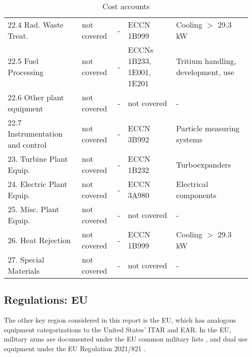 \begin{table}[h!]
{\begin{tabular}{p{4cm}p{3cm}p{3cm}p{3cm}p{3cm}}
        22.4 Rad. Waste Treat. & not covered & - & ECCN 1B999 & Cooling $>$ 29.3 kW \\
        22.5 Fuel Processing & not covered & - & ECCNs 1B233, 1E001, 1E201 & Tritium handling, development, use \\
        22.6 Other plant equipment & not covered & - & not covered & - \\
        22.7 Instrumentation and control & not covered & - & ECCN 3B992 & Particle measuring systems \\
        23. Turbine Plant Equip. & not covered & - & ECCN 1B232 & Turboexpanders \\
        24. Electric Plant Equip. & not covered & - & ECCN 3A980 & Electrical components \\
        25. Misc. Plant Equip. & not covered & - & not covered & - \\
        26. Heat Rejection & not covered & - & ECCN 1B999 & Cooling $>$ 29.3 kW \\
        27. Special Materials & not covered & - & not covered & - \\
        \hline  
    \end{tabular}}
    \caption{Cost accounts}
    \label{tab:costs}
\end{table}


\subsection{Regulations: EU}

The other key region considered in this report is the EU, which has analogous equipment categorizations to the United States' ITAR and EAR. In the EU, military arms are documented under the EU common military lists \cite{eu_common_military_list}, and dual use equipment under the EU Regulation 2021/821 \cite{europaEURLex32021R0821}. 


